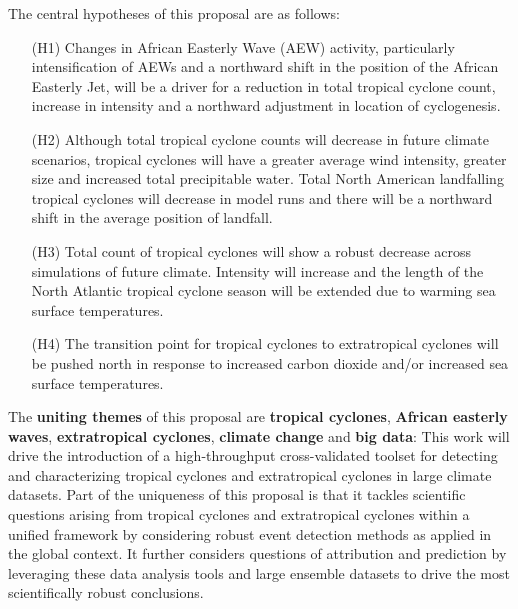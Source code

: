 \documentclass[11pt]{article}
\begin{document}
The central hypotheses of this proposal are as follows:

\vspace{-0.4cm}
\begin{itemize}

\item[(H1)] Changes in African Easterly Wave (AEW) activity, particularly intensification of AEWs and a northward shift in the position of the African Easterly Jet, will be a driver for a reduction in total tropical cyclone count, increase in intensity and a northward adjustment in location of cyclogenesis.

\item[(H2)] Although total tropical cyclone counts will decrease in future climate scenarios, tropical cyclones will have a greater average wind intensity, greater size and increased total precipitable water.  Total North American landfalling tropical cyclones will decrease in model runs and there will be a northward shift in the average position of landfall.


\item[(H3)] Total count of tropical cyclones will show a robust decrease across simulations of future climate.  Intensity will increase and the length of the North Atlantic tropical cyclone season will be extended due to warming sea surface temperatures.

\item[(H4)] The transition point for tropical cyclones to extratropical cyclones will be pushed north in response to increased carbon dioxide and/or increased sea surface temperatures.
\end{itemize}

The \textbf{uniting themes} of this proposal are \textbf{tropical cyclones}, \textbf{African easterly waves}, \textbf{extratropical cyclones}, \textbf{climate change} and \textbf{big data}: This work will drive the introduction of a high-throughput cross-validated toolset for detecting and characterizing tropical cyclones and extratropical cyclones in large climate datasets.  Part of the uniqueness of this proposal is that it tackles scientific questions arising from tropical cyclones and extratropical cyclones within a unified framework by considering robust event detection methods as applied in the global context.  It further considers questions of attribution and prediction by leveraging these data analysis tools and large ensemble datasets to drive the most scientifically robust conclusions.
\end{document}
